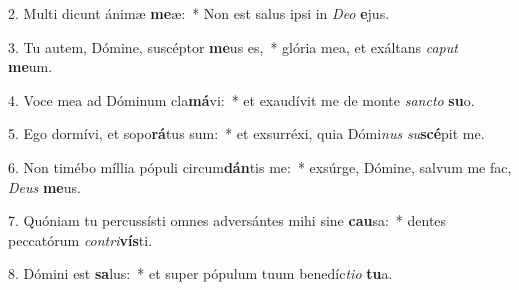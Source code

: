 2. Multi dicunt ánimæ \textbf{me}æ:~*  Non est salus ipsi in \textit{De}\textit{o} \textbf{e}jus.\

3. Tu autem, Dómine, suscéptor \textbf{me}us es,~*  glória mea, et exáltans \textit{ca}\textit{put} \textbf{me}um.\

4. Voce mea ad Dóminum cla\textbf{má}vi:~*  et exaudívit me de monte \textit{sanc}\textit{to} \textbf{su}o.\

5. Ego dormívi, et sopo\textbf{rá}tus sum:~*  et exsurréxi, quia Dómi\textit{nus} \textit{su}\textbf{scé}pit me.\

6. Non timébo míllia pópuli circum\textbf{dán}tis me:~*  exsúrge, Dómine, salvum me fac, \textit{De}\textit{us} \textbf{me}us.\

7. Quóniam tu percussísti omnes adversántes mihi sine \textbf{cau}sa:~*  dentes peccatórum \textit{con}\textit{tri}\textbf{vís}ti.\

8. Dómini est \textbf{sa}lus:~*  et super pópulum tuum benedíc\textit{ti}\textit{o} \textbf{tu}a.\

